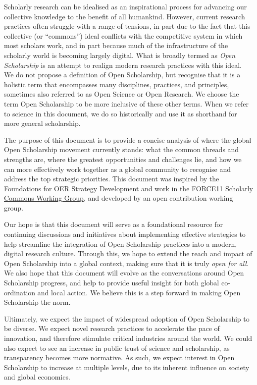 Scholarly research can be idealised as an inspirational process for
advancing our collective knowledge to the benefit of all humankind.
However, current research practices often struggle with a range of
tensions, in part due to the fact that this collective (or ``commons'')
ideal conflicts with the competitive system in which most scholars work,
and in part because much of the infrastructure of the scholarly world is
becoming largely digital. What is broadly termed as \emph{Open
Scholarship} is an attempt to realign modern research practices with
this ideal. We do not propose a definition of Open Scholarship, but
recognise that it is a holistic term that encompasses many disciplines,
practices, and principles, sometimes also referred to as Open Science or
Open Research. We choose the term Open Scholarship to be more inclusive
of these other terms. When we refer to science in this document, we do
so historically and use it as shorthand for more general scholarship.

The purpose of this document is to provide a concise analysis of where
the global Open Scholarship movement currently stands: what the common
threads and strengths are, where the greatest opportunities and
challenges lie, and how we can more effectively work together as a
global community to recognise and address the top strategic priorities.
This document was inspired by the
\href{http://www.oerstrategy.org/home/read-the-doc/}{Foundations for OER
Strategy Development} and work in the
\href{https://www.force11.org/group/scholarly-commons-working-group}{FORCE11
Scholarly Commons Working Group}, and developed by an open contribution
working group.

Our hope is that this document will serve as a foundational resource for
continuing discussions and initiatives about implementing effective
strategies to help streamline the integration of Open Scholarship
practices into a modern, digital research culture. Through this, we hope
to extend the reach and impact of Open Scholarship into a global
context, making sure that it is truly \emph{open for all}. We also hope
that this document will evolve as the conversations around Open
Scholarship progress, and help to provide useful insight for both global
co-ordination and local action. We believe this is a step forward in
making Open Scholarship the norm.

Ultimately, we expect the impact of widespread adoption of Open
Scholarship to be diverse. We expect novel research practices to
accelerate the pace of innovation, and therefore stimulate critical
industries around the world. We could also expect to see an increase in
public trust of science and scholarship, as transparency becomes more
normative. As such, we expect interest in Open Scholarship to increase
at multiple levels, due to its inherent influence on society and global
economics.

